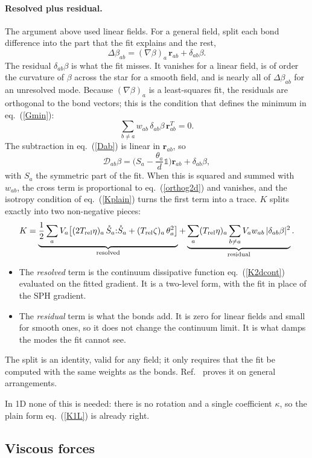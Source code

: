 \documentclass[11pt,aps,preprint,nofootinbib,superscriptaddress,tightenlines]{revtex4-2}
\def\st{\begin{equation}}
\def\stp{\end{equation}}
\def\Eq#1{eq.~(\ref{#1})}
\newcommand{\one}{\mathds{1}}
\let\oldparagraph\paragraph
\renewcommand{\paragraph}{\par\bigskip\oldparagraph}
\begin{document}
\paragraph{Resolved plus residual.}  The argument above used linear fields.
For a general field, split each bond difference into the part that the fit
explains and the rest,
\st
\Delta\beta_{ab}=(\nabla\beta)_a\,\bm r_{ab}+\delta_{ab}\beta .
\label{resid}
\stp
The residual $\delta_{ab}\beta$ is what the fit misses.  It vanishes for a linear
field, is of order the curvature of $\beta$ across the star for a smooth field,
and is nearly all of $\Delta\beta_{ab}$ for an unresolved mode.  Because
$(\nabla\beta)_a$ is a least-squares fit, the residuals are orthogonal to the
bond vectors; this is the condition that defines the minimum in \Eq{Gmin}:
\st
\sum_{b\neq a}w_{ab}\,\delta_{ab}\beta\,\bm r_{ab}^T=0 .
\label{orthog2d}
\stp
The subtraction in \Eq{Dab} is linear in $\bm r_{ab}$, so
\st
\mathcal D_{ab}\beta=\Big(S_a-\frac{\theta_a}{d}\one\Big)\bm r_{ab}+\delta_{ab}\beta,
\stp
with $S_a$ the symmetric part of the fit.  When this is squared and summed
with $w_{ab}$, the cross term is proportional to \Eq{orthog2d} and vanishes, and
the isotropy condition of \Eq{Kplain} turns the first term into a trace.
$K$ splits exactly into two non-negative pieces:
\st
K=\underbrace{\frac12\sum_aV_a\big[(2T_{\rm rel}\eta)_a\,\mathring S_a{:}\mathring S_a+(T_{\rm rel}\zeta)_a\,\theta_a^2\big]}_{\text{resolved}}
+\underbrace{\sum_a(T_{\rm rel}\eta)_a\sum_{b\neq a}V_aw_{ab}\,|\delta_{ab}\beta|^2}_{\text{residual}} .
\label{split2d}
\stp
\begin{itemize}
\item The \emph{resolved} term is the continuum dissipative function
  \Eq{K2dcont} evaluated on the fitted gradient.  It is a two-level form, with
  the fit in place of the SPH gradient.
\item The \emph{residual} term is what the bonds add.  It is zero for linear
  fields and small for smooth ones, so it does not change the continuum limit.
  It is what damps the modes the fit cannot see.
\end{itemize}
The split is an identity, valid for any field; it only requires that the fit be
computed with the same weights as the bonds.  Ref.~\cite{ParticleMetrics}
proves it on general arrangements.

In 1D none of this is needed: there is no rotation and a single coefficient
$\kappa$, so the plain form \Eq{K1L} is already right.

\subsection{Viscous forces}
\label{sec:force2d}
\end{document}
